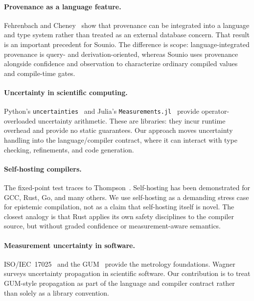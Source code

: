 \documentclass[acmsmall,screen,review,anonymous]{acmart}
\begin{document}
\paragraph{Provenance as a language feature.}
Fehrenbach and Cheney~\cite{fehrenbach2018lip} show that provenance can be
integrated into a language and type system rather than treated as an external
database concern.
That result is an important precedent for Sounio.
The difference is scope: language-integrated provenance is query- and
derivation-oriented, whereas Sounio uses provenance alongside confidence and
observation to characterize ordinary compiled values and compile-time gates.

\paragraph{Uncertainty in scientific computing.}
Python's \texttt{uncertainties}~\cite{lebigot2024uncertainties} and
Julia's \texttt{Measurements.jl}~\cite{giordano2016measurements} provide
operator-overloaded uncertainty arithmetic.
These are libraries: they incur runtime overhead and provide no static
guarantees.
Our approach moves uncertainty handling into the language/compiler contract,
where it can interact with type checking, refinements, and code generation.

\paragraph{Self-hosting compilers.}
The fixed-point test traces to Thompson~\cite{thompson1984trusting}.
Self-hosting has been demonstrated for GCC, Rust, Go, and many others.
We use self-hosting as a demanding stress case for epistemic compilation,
not as a claim that self-hosting itself is novel.
The closest analogy is that Rust applies its own safety disciplines to the
compiler source, but without graded confidence or measurement-aware semantics.

\paragraph{Measurement uncertainty in software.}
ISO/IEC~17025~\cite{iso17025} and the GUM~\cite{jcgm2008gum} provide
the metrology foundations.
Wagner~\cite{wagner2022uncertainty} surveys uncertainty propagation
in scientific software.
Our contribution is to treat GUM-style propagation as part of the language and
compiler contract rather than solely as a library convention.

\end{document}
